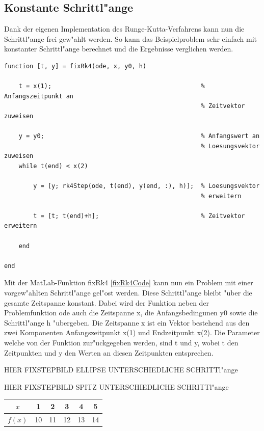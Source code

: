 \begin{refsection}
\section{Konstante Schrittl"ange}

Dank der eigenen Implementation des Runge-Kutta-Verfahrens kann nun die Schrittl"ange frei gew"ahlt werden.
So kann das Beispielproblem sehr einfach mit konstanter Schrittl"ange berechnet und die Ergebnisse verglichen werden. 


\begin{lstlisting}[style=Matlab, caption=Konstante Schrittl"ange, captionpos=b, label=fixRk4Code] 
function [t, y] = fixRk4(ode, x, y0, h)                 
    
    t = x(1);                                         % Anfangszeitpunkt an
                                                      % Zeitvektor zuweisen
                                                        
    y = y0;                                           % Anfangswert an
                                                      % Loesungsvektor zuweisen
    while t(end) < x(2)
  
        y = [y; rk4Step(ode, t(end), y(end, :), h)];  % Loesungsvektor
                                                      % erweitern 
                                                        
        t = [t; t(end)+h];                            % Zeitvektor erweitern

    end

end
\end{lstlisting}

Mit der MatLab-Funktion fixRk4 \ref{fixRk4Code} kann nun ein Problem mit einer vorgew"ahlten Schrittl"ange gel"ost werden.
Diese Schrittl"ange bleibt "uber die gesamte Zeitspanne konstant.
Dabei wird der Funktion neben der Problemfunktion ode auch die Zeitspanne x, die Anfangsbedingunen y0 sowie die Schrittl"ange h "ubergeben.
Die Zeitspanne x ist ein Vektor bestehend aus den zwei Komponenten Anfangszeitpunkt x(1) und Endzeitpunkt x(2).
Die Parameter welche von der Funktion zur"uckgegeben werden, sind t und y, wobei t den Zeitpunkten und y den Werten an diesen Zeitpunkten entsprechen.

HIER FIXSTEPBILD ELLIPSE UNTERSCHIEDLICHE SCHRITTl"ange

HIER FIXSTEPBILD SPITZ UNTERSCHIEDLICHE SCHRITTl"ange

\begin{tabular}{|c|c|c|c|c|c|}
\hline
$x$ & 1 & 2 & 3 & 4 & 5 \\ \hline
$f(x)$ & 10 & 11 & 12 & 13 & 14 \\ \hline


\end{tabular}
\end{refsection}
